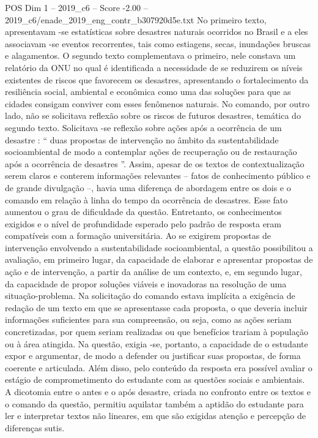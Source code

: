 \begin{textsample}{POS Dim 1 – 2019\_c6 – Score -2.00 – 2019\_c6/enade\_2019\_eng\_contr\_b307920d5e.txt}
No primeiro texto, apresentavam -se estatísticas sobre desastres naturais ocorridos no Brasil e a eles associavam -se eventos recorrentes, tais como estiagens, secas, inundações bruscas e alagamentos.
O segundo texto complementava o primeiro, nele constava um relatório da ONU no qual é identificada a necessidade de se reduzirem os níveis existentes de riscos que favorecem os desastres, apresentando o fortalecimento da resiliência social, ambiental e econômica como uma das soluções para que as cidades consigam conviver com esses fenômenos naturais.
No comando, por outro lado, não se solicitava reflexão sobre os riscos de futuros desastres, temática do segundo texto.
Solicitava -se reflexão sobre ações após a ocorrência de um desastre : “ duas propostas de intervenção no âmbito da sustentabilidade socioambiental de modo a contemplar ações de recuperação ou de restauração após a ocorrência de desastres ”.
Assim, apesar de os textos de contextualização serem claros e conterem informações relevantes – fatos de conhecimento público e de grande divulgação –, havia uma diferença de abordagem entre os dois e o comando em relação à linha do tempo da ocorrência de desastres.
Esse fato aumentou o grau de dificuldade da questão.
Entretanto, os conhecimentos exigidos e o nível de profundidade esperado pelo padrão de resposta eram compatíveis com a formação universitária.
Ao se exigirem propostas de intervenção envolvendo a sustentabilidade socioambiental, a questão possibilitou a avaliação, em primeiro lugar, da capacidade de elaborar e apresentar propostas de ação e de intervenção, a partir da análise de um contexto, e, em segundo lugar, da capacidade de propor soluções viáveis e inovadoras na resolução de uma situação-problema.
Na solicitação do comando estava implícita a exigência de redação de um texto em que se apresentasse cada proposta, o que deveria incluir informações suficientes para sua compreensão, ou seja, como as ações seriam concretizadas, por quem seriam realizadas ou que benefícios trariam à população ou à área atingida.
Na questão, exigia -se, portanto, a capacidade de o estudante expor e argumentar, de modo a defender ou justificar suas propostas, de forma coerente e articulada.
Além disso, pelo conteúdo da resposta era possível avaliar o estágio de comprometimento do estudante com as questões sociais e ambientais.
A dicotomia entre o antes e o após desastre, criada no confronto entre os textos e o comando da questão, permitiu aquilatar também a aptidão do estudante para ler e interpretar textos não lineares, em que são exigidas atenção e percepção de diferenças sutis.

\end{textsample}
